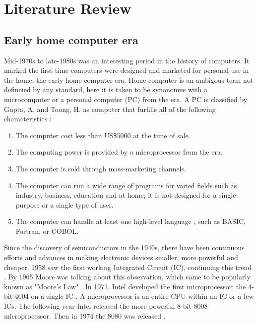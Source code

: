 

\chapter{Literature Review} %
\label{Chapter2} %

\section{Early home computer era}
 
Mid-1970s to late-1980s was an interesting period in the history of computers. It marked the first time computers were designed and marketed for personal use in the home: the early home computer era. Home computer is an ambigous term not defineied by any standard, here it is taken to be synonomus with a microcomputer or a personal computer (PC) from the era.  A PC is classified by Gupta, A. and Toong, H.  as computer that furfills all of the following characteristics \cite{Gupta84}: \\

\begin{enumerate}
\item The computer cost less than US\$5000 at the time of sale.\\
\item The computing power is provided by a microprocessor from the era. \\
\item The computer is sold through mass-marketing channels. \\
\item The computer can run a wide range of programs for varied fields such as industry, business, education and at home; it is not designed for a single purpose or a single type of user.
\item The computer can handle at least one high-level language , such as BASIC, Fortran, or COBOL.
\end{enumerate}

Since the discovery of semiconductors in the 1940s, there have been continuous efforts and advances in making electronic devices smaller, more powerful and cheaper. 1958 saw the first working Integrated Circuit (IC), continuing this trend \cite{Kilby01}. By 1965 Moore was talking about this observation, which came to be popularly known as "Moore's Law" \cite{Moore65}. In 1971, Intel developed the first microprocessor; the 4-bit 4004 on a single IC \cite{intel4004}. A microprocessor is an entire CPU within an IC or a few ICs. The following year Intel released the more powerful 8-bit 8008 microprocessor. Then in 1974 the 8080 was released \cite{intelchips}. \\

